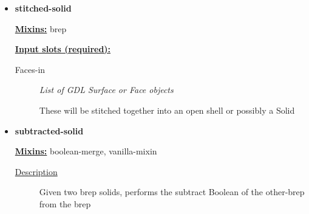 \documentclass [11pt]{book}
\begin{document}
\begin{itemize}







\item {}
\label{prim:stitched-solid}
\textbf{stitched-solid}


\textbf{
\underline{Mixins:}} brep





\textbf{
\underline{Input slots (required):}}

\begin{description}

\item [Faces-in]
\emph{List of GDL Surface or Face objects}

 These will be stitched together into an open shell or possibly a Solid




\end{description}







\item {}
\label{prim:subtracted-solid}
\textbf{subtracted-solid}


\textbf{
\underline{Mixins:}} boolean-merge, vanilla-mixin





\begin{description}

\item [
\underline{Description}]


Given two brep solids, performs the subtract Boolean of the other-brep from the brep



\end{description}










\end{itemize}
\end{document}
